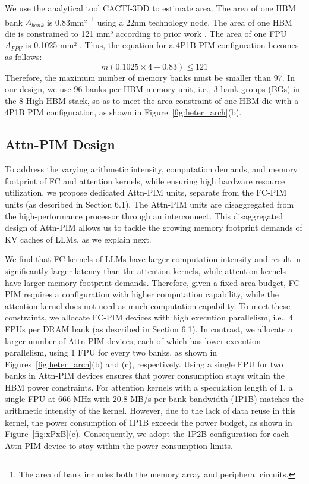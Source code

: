 We use the analytical tool CACTI-3DD \cite{chen2012cacti} to estimate area. The area of one HBM bank $A_{bank}$ is 0.83mm²~\footnote{The area of bank includes both the memory array and peripheral circuits.} using a 22nm technology node. The area of one HBM die is constrained to 121 mm² according to prior work \cite{ryu202316}. 
The area of one FPU $A_{FPU}$ is 0.1025 mm² \cite{park2024attacc}.
Thus, the equation for a 4P1B PIM configuration becomes as follows: 
\begin{equation}
    m(0.1025 \times 4 + 0.83) \leq 121
\end{equation}
Therefore, the maximum number of memory banks must be smaller than 97. In our design, we use 96 banks per HBM memory unit, i.e., 3 bank groups (BGs) in the 8-High HBM stack, so as to meet the area constraint of one HBM die with a 4P1B PIM configuration, as shown in Figure~\ref{fig:heter_arch}(b).





\subsection{Attn-PIM Design}

To address the varying arithmetic intensity, computation demands, and memory footprint of FC and attention kernels, while ensuring high hardware resource utilization, we propose dedicated Attn-PIM units, separate from the FC-PIM units (as described in Section 6.1). The Attn-PIM units are disaggregated from the high-performance processor through an interconnect. This disaggregated design of Attn-PIM allows us to tackle the growing memory footprint demands of KV caches of LLMs, as we explain next.



We find that FC kernels of LLMs have larger computation intensity and result in significantly larger latency than the attention kernels, while attention kernels have larger memory footprint demands. Therefore, given a fixed area budget, FC-PIM requires a configuration with higher computation capability, while the attention kernel does not need as much computation capability. To meet these constraints, we allocate FC-PIM devices with high execution parallelism, i.e., 4 FPUs per DRAM bank (as described in Section 6.1). In contrast, we allocate a larger number of Attn-PIM devices, each of which has lower execution parallelism, using 1 FPU for every two banks, as shown in Figures~\ref{fig:heter_arch}(b) and (c), respectively. Using a single FPU for two banks in Attn-PIM devices ensures that power consumption stays within the HBM power constraints. For attention kernels with a speculation length of 1, a single FPU at 666 MHz with 20.8 MB/s per-bank bandwidth (1P1B) matches the arithmetic intensity of the kernel. However, due to the lack of data reuse in this kernel, the power consumption of 1P1B exceeds the power budget, as shown in Figure~\ref{fig:xPxB}(c). Consequently, we adopt the 1P2B configuration for each Attn-PIM device to stay within the power consumption limits.



